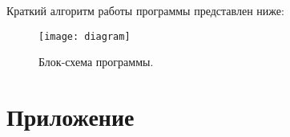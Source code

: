 Краткий алгоритм работы программы представлен ниже:

\begin{figure}[ht]
    \centering
    \texttt{[image: diagram]}
    \caption{Блок-схема программы.}
\end{figure}

\clearpage


\nocite{*}

\printbibliography{}

\clearpage

\section*{Приложение}

\inputminted[fontfamily=courier, mathescape]{python}{app/main.py}
